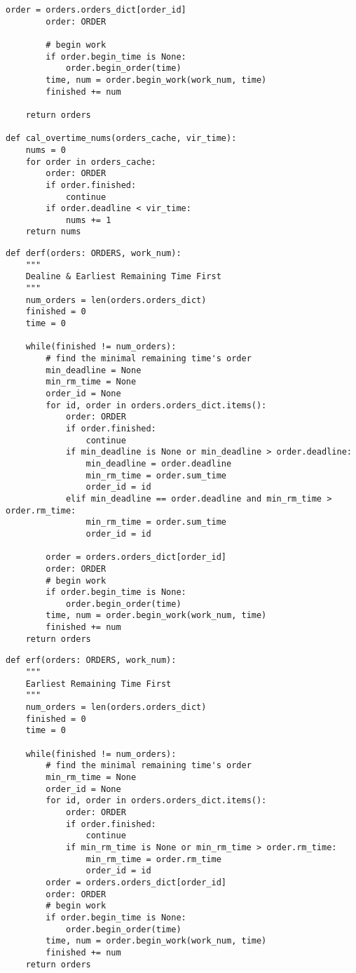 \begin{lstlisting}[caption={meonf}, label={lst:python}]
        order = orders.orders_dict[order_id]
        order: ORDER
        
        # begin work
        if order.begin_time is None:
            order.begin_order(time)
        time, num = order.begin_work(work_num, time)
        finished += num
        
    return orders
    
def cal_overtime_nums(orders_cache, vir_time):
    nums = 0
    for order in orders_cache:
        order: ORDER
        if order.finished:
            continue
        if order.deadline < vir_time:
            nums += 1
    return nums

\end{lstlisting}


\begin{lstlisting}[caption={derf}, label={lst:python}]
def derf(orders: ORDERS, work_num):
    """
    Dealine & Earliest Remaining Time First
    """
    num_orders = len(orders.orders_dict)
    finished = 0
    time = 0
    
    while(finished != num_orders):
        # find the minimal remaining time's order
        min_deadline = None
        min_rm_time = None
        order_id = None
        for id, order in orders.orders_dict.items():
            order: ORDER
            if order.finished:
                continue
            if min_deadline is None or min_deadline > order.deadline:
                min_deadline = order.deadline
                min_rm_time = order.sum_time
                order_id = id
            elif min_deadline == order.deadline and min_rm_time > order.rm_time:
                min_rm_time = order.sum_time
                order_id = id
                    
        order = orders.orders_dict[order_id]
        order: ORDER
        # begin work
        if order.begin_time is None:
            order.begin_order(time)
        time, num = order.begin_work(work_num, time)
        finished += num
    return orders
\end{lstlisting}


\begin{lstlisting}[caption={erf}, label={lst:python}]
def erf(orders: ORDERS, work_num):
    """
    Earliest Remaining Time First
    """
    num_orders = len(orders.orders_dict)
    finished = 0
    time = 0
    
    while(finished != num_orders):
        # find the minimal remaining time's order
        min_rm_time = None
        order_id = None
        for id, order in orders.orders_dict.items():
            order: ORDER
            if order.finished:
                continue
            if min_rm_time is None or min_rm_time > order.rm_time:
                min_rm_time = order.rm_time
                order_id = id
        order = orders.orders_dict[order_id]
        order: ORDER
        # begin work
        if order.begin_time is None:
            order.begin_order(time)
        time, num = order.begin_work(work_num, time)
        finished += num
    return orders
\end{lstlisting}

